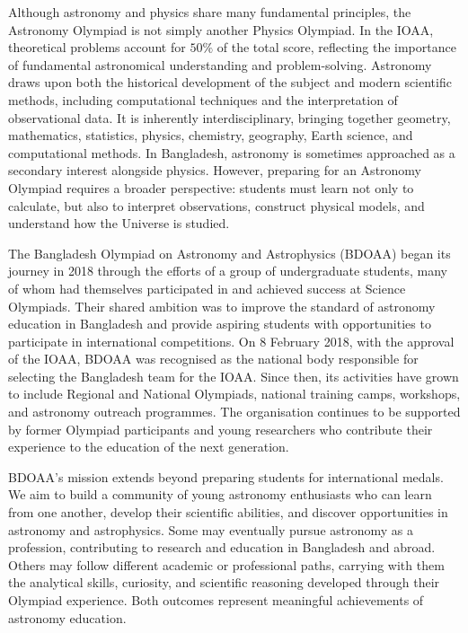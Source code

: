 \documentclass[10pt,a5paper,twoside]{article}
\newcounter{problem}[section]
\begin{document}
Although astronomy and physics share many fundamental principles, the Astronomy Olympiad is not simply another Physics Olympiad. In the IOAA, theoretical problems account for $50\%$ of the total score, reflecting the importance of fundamental astronomical understanding and problem-solving. Astronomy draws upon both the historical development of the subject and modern scientific methods, including computational techniques and the interpretation of observational data. It is inherently interdisciplinary, bringing together geometry, mathematics, statistics, physics, chemistry, geography, Earth science, and computational methods. In Bangladesh, astronomy is sometimes approached as a secondary interest alongside physics. However, preparing for an Astronomy Olympiad requires a broader perspective: students must learn not only to calculate, but also to interpret observations, construct physical models, and understand how the Universe is studied.

The Bangladesh Olympiad on Astronomy and Astrophysics (BDOAA) began its journey in 2018 through the efforts of a group of undergraduate students, many of whom had themselves participated in and achieved success at Science Olympiads. Their shared ambition was to improve the standard of astronomy education in Bangladesh and provide aspiring students with opportunities to participate in international competitions. On 8 February 2018, with the approval of the IOAA, BDOAA was recognised as the national body responsible for selecting the Bangladesh team for the IOAA. Since then, its activities have grown to include Regional and National Olympiads, national training camps, workshops, and astronomy outreach programmes. The organisation continues to be supported by former Olympiad participants and young researchers who contribute their experience to the education of the next generation.

BDOAA's mission extends beyond preparing students for international medals. We aim to build a community of young astronomy enthusiasts who can learn from one another, develop their scientific abilities, and discover opportunities in astronomy and astrophysics. Some may eventually pursue astronomy as a profession, contributing to research and education in Bangladesh and abroad. Others may follow different academic or professional paths, carrying with them the analytical skills, curiosity, and scientific reasoning developed through their Olympiad experience. Both outcomes represent meaningful achievements of astronomy education.
\end{document}
